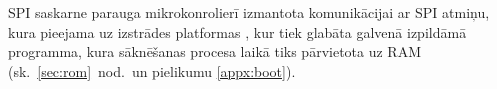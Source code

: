 		
		SPI saskarne parauga mikrokonrolierī izmantota
		komunikācijai ar SPI  atmiņu,
		kura pieejama uz izstrādes platformas \cite[43.~lpp.]{FusionGuide},
		kur tiek glabāta galvenā izpildāmā programma, kura sāknēšanas procesa
		laikā tiks pārvietota uz RAM (sk.~\ref{sec:rom}~nod.~un pielikumu \ref{appx:boot}).
